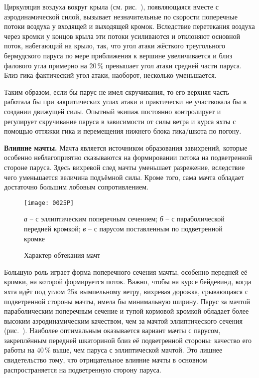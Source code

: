 Циркуляция воздуха вокруг крыла (см. рис.~), появляющаяся
вместе с аэродинамической силой, вызывает незначительные по скорости
поперечные потоки воздуха  у входящей и выходящей
кромок. Вследствие перетекания воздуха через кромки у концов крыла эти
потоки усиливаются и отклоняют основной поток, набегающий на крыло,
так, что угол атаки жёсткого треугольного бермудского паруса по мере
приближения к вершине увеличивается и близ фалового угла примерно на
20\,\% превышает угол атаки средней части паруса. Близ гика
фактический угол атаки, наоборот, несколько уменьшается.

Таким образом, если бы парус не имел скручивания, то его верхняя часть
работала бы при закритических углах атаки и практически не участвовала
бы в создании движущей силы. Опытный экипаж постоянно контролирует и
регулирует скручивание паруса в зависимости от силы ветра и курса яхты
с помощью оттяжки гика и перемещения нижнего блока гика\-/шкота по
погону.

\textbf{Влияние мачты.} Мачта является источником образования
завихрений, которые особенно неблагоприятно сказываются на
формировании потока на подветренной стороне паруса. Здесь вихревой
след мачты уменьшает разрежение, вследствие чего уменьшается величина
подъёмной силы. Кроме того, сама мачта обладает достаточно большим
лобовым сопротивлением.

\begin{figure}[htb]
  \centering
  \texttt{[image: 0025P]}
  \caption{Характер обтекания мачт}
  \label{fig:25}
  \small
  \centering{}
  \textit{а} \--- с эллиптическим поперечным сечением; \textit{б} \--- с параболической передней кромкой; \textit{в} \--- с парусом поставленным по подветренной кромке
\end{figure}

Большую роль играет форма поперечного сечения мачты, особенно передней
её кромки, на которой формируется поток. Важно, чтобы на курсе
бейдевинд, когда яхта идёт под углом 25\gr к вымпельному
ветру, вихревая дорожка, срывающаяся с подветренной стороны мачты,
имела бы минимальную ширину. Парус за мачтой параболическим поперечным
сечение и тупой кормовой кромкой обладает более высоким
аэродинамическим качеством, чем за мачтой эллиптического сечения
(рис.~). Наиболее оптимальным оказывается вариант мачты с
парусом, закреплённым передней шкаториной близ её подветренной
стороны: качество его работы на 40\,\% выше, чем паруса с
эллиптической мачтой. Это лишнее свидетельство тому, что отрицательное
влияние мачты в основном распространяется на подветренную сторону
паруса.

